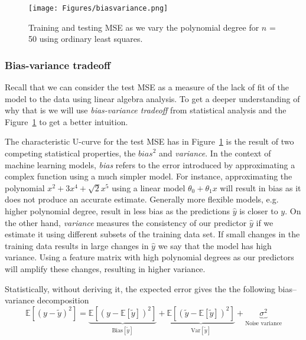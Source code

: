 \documentclass[amssymb,twocolumn,aps]{revtex4}
\begin{document}
\begin{figure}[h]
    \centering
    \texttt{[image: Figures/biasvariance.png]}
    \caption{Training and testing MSE as we vary the polynomial degree for $n$ = 50 using ordinary least squares.}
    \label{fig:biasvariancemse}
\end{figure}

\subsubsection{Bias-variance tradeoff}
\label{sec:bvt}
Recall that we can consider the test MSE as a measure of the lack of fit of the model to the data using linear algebra analysis. To get a deeper understanding of why that is we will use \textit{bias-variance tradeoff} from statistical analysis and the Figure~\ref{fig:biasvariancemse} to get a better intuition.

The characteristic U-curve for the test MSE has in Figure~\ref{fig:biasvariancemse} is the result of two competing statistical properties, the $\textit{bias}^2$ and \textit{variance}. In the context of machine learning models, \textit{bias} refers to the error introduced by approximating a complex function using a much simpler model. For instance, approximating the polynomial $x^2+3x^4+\sqrt{2}x^5$ using a linear model $\theta_0 +\theta_1x$ will result in bias as it does not produce an accurate estimate. Generally more flexible models, e.g. higher polynomial degree, result in less bias \cite{introstat2} as the predictions $\hat{y}$ is closer to $y$. On the other hand, \textit{variance} measures the consistency of our predictor $\hat{y}$ if we estimate it using different subsets of the training data set. If small changes in the training data results in large changes in $\hat{y}$ we say that the model has high variance. Using a feature matrix with high polynomial degrees as our predictors will amplify these changes, resulting in higher variance.

Statistically, without deriving it, the expected error gives the the following bias–variance decomposition
\begin{equation}
    \label{eq:bias_variance}
    \mathbb{E}\!\left[(y - \tilde{y})^2\right]
    =
    \underbrace{\mathbb{E}\!\left[(y - \mathbb{E}[\tilde{y}])^2\right]}_{\text{Bias}[\tilde{y}]}
    +
    \underbrace{\mathbb{E}\!\left[(\tilde{y} - \mathbb{E}[\tilde{y}])^2\right]}_{\text{Var}[\tilde{y}]}
    +
    \underbrace{\sigma^2}_{\text{Noise variance}}
\end{equation}
\end{document}
